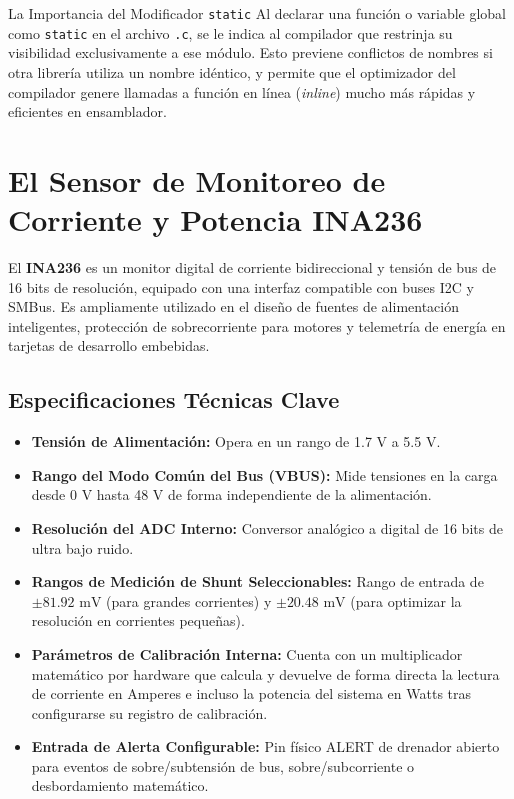 \documentclass[
10pt, %
a4paper, %
oneside, %
headinclude,footinclude, %
BCOR5mm, %
]{scrartcl}
\begin{document}
\begin{WarningBox}{La Importancia del Modificador \texttt{static}}
	Al declarar una función o variable global como \texttt{static} en el archivo \texttt{.c}, se le indica al compilador que restrinja su visibilidad exclusivamente a ese módulo. Esto previene conflictos de nombres si otra librería utiliza un nombre idéntico, y permite que el optimizador del compilador genere llamadas a función en línea (\textit{inline}) mucho más rápidas y eficientes en ensamblador.
\end{WarningBox}

\newpage
\section{El Sensor de Monitoreo de Corriente y Potencia INA236}

El \textbf{INA236} es un monitor digital de corriente bidireccional y tensión de bus de 16 bits de resolución, equipado con una interfaz compatible con buses I2C y SMBus. Es ampliamente utilizado en el diseño de fuentes de alimentación inteligentes, protección de sobrecorriente para motores y telemetría de energía en tarjetas de desarrollo embebidas.

\subsection{Especificaciones Técnicas Clave}
\begin{itemize}
	\item \textbf{Tensión de Alimentación:} Opera en un rango de 1.7 V a 5.5 V.
	\item \textbf{Rango del Modo Común del Bus (VBUS):} Mide tensiones en la carga desde 0 V hasta 48 V de forma independiente de la alimentación.
	\item \textbf{Resolución del ADC Interno:} Conversor analógico a digital de 16 bits de ultra bajo ruido.
	\item \textbf{Rangos de Medición de Shunt Seleccionables:} Rango de entrada de $\pm 81.92\text{ mV}$ (para grandes corrientes) y $\pm 20.48\text{ mV}$ (para optimizar la resolución en corrientes pequeñas).
	\item \textbf{Parámetros de Calibración Interna:} Cuenta con un multiplicador matemático por hardware que calcula y devuelve de forma directa la lectura de corriente en Amperes e incluso la potencia del sistema en Watts tras configurarse su registro de calibración.
	\item \textbf{Entrada de Alerta Configurable:} Pin físico ALERT de drenador abierto para eventos de sobre/subtensión de bus, sobre/subcorriente o desbordamiento matemático.
\end{itemize}
\end{document}
